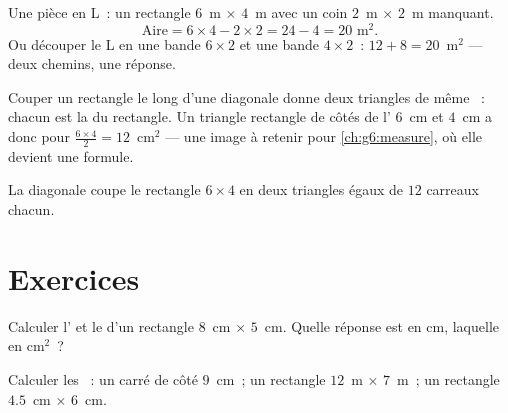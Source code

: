 \begin{example}\label{ex:g5:areas:composite}
Une pièce en L~: un rectangle $6$~m $\times$ $4$~m avec un coin
$2$~m $\times$ $2$~m manquant.
\[
\text{Aire} = 6 \times 4 - 2 \times 2 = 24 - 4 = 20 \text{ m}^2 .
\]
Ou découper le L en une bande $6 \times 2$ et une bande
$4 \times 2$~: $12 + 8 = 20$~m$^2$ --- deux chemins, une réponse.
\end{example}

\begin{example}\label{ex:g5:areas:halfrect}
Couper un rectangle le long d'une diagonale donne deux triangles de
même ~: chacun est la \emph{} du rectangle. Un triangle
rectangle de côtés de l' $6$~cm et $4$~cm a donc pour
 $\frac{6 \times 4}{2} = 12$~cm$^2$ --- une image à retenir
pour \cref{ch:g6:measure}, où elle devient une formule.
\end{example}

\begin{omfigure}

{\small La diagonale coupe le rectangle $6 \times 4$ en deux
triangles égaux de $12$ carreaux chacun.}
\end{omfigure}

\section{Exercices}

\begin{exercise}[$\star$]\label{exo:g5:areas:1}
Calculer l' et le  d'un rectangle $8$~cm $\times$
$5$~cm. Quelle réponse est en cm, laquelle en cm$^2$~?
\end{exercise}

\begin{exercise}[$\star$]\label{exo:g5:areas:2}
Calculer les ~: un carré de côté $9$~cm~; un rectangle
$12$~m $\times$ $7$~m~; un rectangle $4.5$~cm $\times$ $6$~cm.
\end{exercise}

